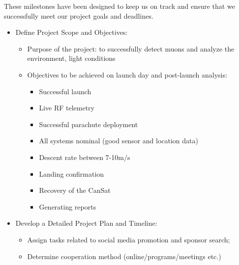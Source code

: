 \documentclass[11pt]{article}
\begin{document}
These milestones have been designed to keep us on track and ensure that we successfully meet our project goals and deadlines.
\begin{itemize}[leftmargin=1cm, itemindent=0.25cm, noitemsep, topsep=0pt, label=$\bullet$]
    \item Define Project Scope and Objectives:
    \begin{itemize}[label=, noitemsep, topsep=0pt]
        \item Purpose of the project: to successfully detect muons and analyze the environment, light conditions
        \item Objectives to be achieved on launch day and post-launch analysis:
        \begin{multicols}{2}
        \setlength{\topsep}{0pt}
        \setlength{\partopsep}{0pt}
        \begin{itemize}[label=, noitemsep, topsep=0pt]
        \item Successful launch
        \item Live RF telemetry
        \item Successful parachute deployment
        \item All systems nominal (good sensor and location data)
        \item Descent rate between 7-10m/s
        \item Landing confirmation
        \item Recovery of the CanSat
        \item Generating reports
        \end{itemize}
        \end{multicols}
    \end{itemize}
    \item Develop a Detailed Project Plan and Timeline:
    \begin{itemize}[label=, noitemsep, topsep=0pt]
        \item Assign tasks related to social media promotion and sponsor search;
        \item Determine cooperation method (online/programs/meetings etc.)

\end{itemize}
\end{itemize}
\end{document}
